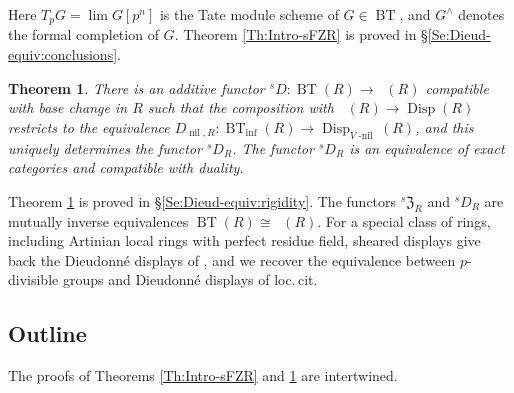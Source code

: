 \documentclass[a4paper,11pt]{amsart}
\theoremstyle{plain}
\newtheorem{ThmABC}[LeABC]{Theorem}
\theoremstyle{definition}
\theoremstyle{remark}
\numberwithin{equation}{section}
\newcommand{\FZ}{\mathfrak{Z}}
\DeclareMathOperator{\nil}{nil}
\DeclareMathOperator{\nnil}{-nil}
\DeclareMathOperator{\BT}{BT}
\DeclareMathOperator{\Disp}{Disp}
\DeclareMathOperator{\sDisp}{{}^sDisp}
\newcommand{\Vnil}{V{\nnil}}
\newcommand{\sD}{{}^{s\!}D}
\newcommand{\sFZ}{{}^s\FZ}
\begin{document}
Here $T_pG=\lim G[p^n]$ is the Tate module scheme of $G\in\BT$, and $G^\wedge$ denotes the formal completion of $G$.
Theorem \ref{Th:Intro-sFZR} is proved in \S\ref{Se:Dieud-equiv:conclusions}.

\begin{ThmABC}
\label{Th:Intro-sDR}
There is an additive functor $\sD\colon\BT(R)\to\sDisp(R)$ compatible with base change in $R$ such that the composition with $\sDisp(R)\to\Disp(R)$ restricts to the equivalence $D_{\nil,R}\colon\BT_{\inf}(R)\to\Disp_{\Vnil}(R)$, and this uniquely determines the functor $\sD_R$. The functor $\sD_R$ is an equivalence of exact categories and compatible with duality.
\end{ThmABC}

Theorem \ref{Th:Intro-sDR} is proved in \S\ref{Se:Dieud-equiv:rigidity}.
The functors
$\sFZ_R$ and $\sD_R$ are mutually inverse equivalences $\BT(R)\cong\sDisp(R)$. For a special class of rings, including Artinian local rings with perfect residue field, sheared displays give back the Dieudonn\'e displays of \cite{Zink:Dieudonne, Lau:Relations}, and we recover the equivalence between $p$-divisible groups and Dieudonn\'e displays of loc.\,cit.

\subsection{Outline}

The proofs of Theorems \ref{Th:Intro-sFZR} and \ref{Th:Intro-sDR} are intertwined. 
\end{document}
